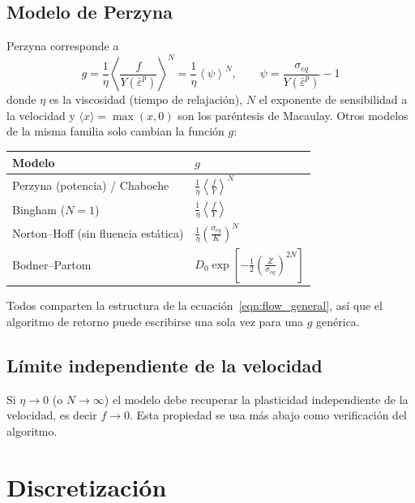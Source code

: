 \documentclass[12pt]{article}
\begin{document}
\subsection*{Modelo de Perzyna}
Perzyna corresponde a
\begin{equation} \label{eqn:perzyna}
    g = \frac{1}{\eta}\left\langle \frac{f}{Y\left(\bar\varepsilon^p\right)} \right\rangle^{N}
      = \frac{1}{\eta}\left\langle \psi \right\rangle^{N}, \qquad
      \psi = \frac{\sigma_{eq}}{Y\left(\bar\varepsilon^p\right)} - 1
\end{equation}
donde $\eta$ es la viscosidad (tiempo de relajaci\'on), $N$ el exponente de sensibilidad a la velocidad y $\langle x \rangle = \max(x, 0)$ son los par\'entesis de Macaulay. Otros modelos de la misma familia solo cambian la funci\'on $g$:
\begin{center}
\renewcommand\arraystretch{1.4}
\begin{tabular}{ll}
    Modelo & $g$ \\ \hline
    Perzyna (potencia) / Chaboche & $\frac{1}{\eta}\left\langle \frac{f}{Y} \right\rangle^{N}$ \\
    Bingham ($N=1$) & $\frac{1}{\eta}\left\langle \frac{f}{Y} \right\rangle$ \\
    Norton--Hoff (sin fluencia est\'atica) & $\frac{1}{\eta}\left(\frac{\sigma_{eq}}{K}\right)^{N}$ \\
    Bodner--Partom & $D_0 \exp\left[-\frac{1}{2}\left(\frac{Z}{\sigma_{eq}}\right)^{2N}\right]$
\end{tabular}
\end{center}
Todos comparten la estructura de la ecuaci\'on~\eqref{eqn:flow_general}, as\'i que el algoritmo de retorno puede escribirse una sola vez para una $g$ gen\'erica.

\subsection*{L\'imite independiente de la velocidad}
Si $\eta \to 0$ (o $N \to \infty$) el modelo debe recuperar la plasticidad independiente de la velocidad, es decir $f \to 0$. Esta propiedad se usa m\'as abajo como verificaci\'on del algoritmo.

\section*{Discretizaci\'on}
\end{document}
